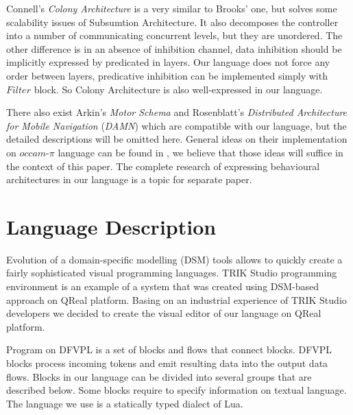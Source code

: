 \documentclass[conference,compsoc]{IEEEtran}
\begin{document}
Connell's \textit{Colony Architecture}\cite{connell1989colony} is a very similar to Brooks' one, but solves some scalability issues of Subsumtion Architecture. It also decomposes the controller into a number of communicating concurrent levels, but they are unordered. The other difference is in an absence of inhibition channel, data inhibition should be implicitly expressed by predicated in layers. Our language does not force any order between layers, predicative inhibition can be implemented simply with $Filter$ block. So Colony Architecture is also well-expressed in our language.

There also exist Arkin’s \textit{Motor Schema}\cite{arkin1987motor} and Rosenblatt’s \textit{Distributed Architecture for Mobile Navigation} (\textit{DAMN})\cite{rosenblatt1997damn} which are compatible with our language, but the detailed descriptions will be omitted here. General ideas on their implementation on $occam\mbox{-}\pi$ language can be found in \cite{simpson2009toward}, we believe that those ideas will suffice in the context of this paper. The complete research of expressing behavioural architectures in our language is a topic for separate paper.


\section{Language Description}
\label{sec:lang}

Evolution of a domain-specific modelling (DSM) tools allows to quickly create a fairly sophisticated visual programming languages\cite{koznov2008}. TRIK Studio programming environment is an example of a system that was created using DSM-based approach on QReal platform\cite{qrealMeta, kuzenkova2013qreal}. Basing on an industrial experience of TRIK Studio developers we decided to create the visual editor of our language on QReal platform.

Program on DFVPL is a set of blocks and flows that connect blocks. DFVPL blocks process incoming tokens and emit resulting data into the output data flows. Blocks in our language can be divided into several groups that are described below. Some blocks require to specify information on textual language. The language we use is a statically typed dialect of Lua\cite{lua}.
\end{document}
